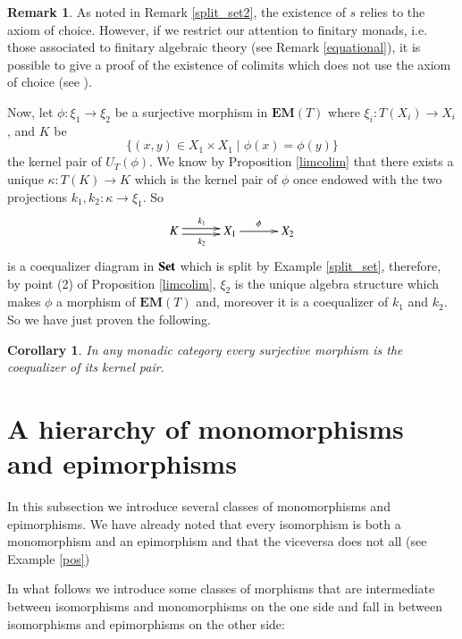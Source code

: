 \documentclass[12pt]{article}
\newtheorem{corollary}[lemma]{Corollary}
\theoremstyle{definition}
\newtheorem{remark}[lemma]{Remark}
\def\X{\mathfrak X}
\newcommand{\Set}{\textbf{\textup{Set}}}
\newcommand{\eim}[1]{\mathbf{EM}{(#1)}}
\numberwithin{equation}{section}
\begin{document}
\begin{remark} As noted in Remark \ref{split_set2}, the existence of $s$ relies to the axiom of choice. However, if we restrict our attention to finitary monads, i.e. those associated to finitary algebraic theory (see Remark \ref{equational}), it is possible to give a proof of the existence of colimits which does not use the axiom of choice (see \cite{linton1}). 
\end{remark}
Now, let $\phi:\xi_1\rightarrow \xi_2$ be a surjective morphism in $\eim{T}$ where $\xi_i:T(X_i)\rightarrow X_i$, and $K$ be
\[\{(x,y)\in X_1\times X_1\mid \phi(x)=\phi(y)\}\]
the kernel pair of $U_T(\phi)$. We know by Proposition \ref{limcolim} that there exists a unique $\kappa:T(K)\rightarrow K$ which is the kernel pair of $\phi$ once endowed with the two projections $k_1, k_2:\kappa \rightarrow \xi_1$. So
\[
\xymatrix@C=30pt{
	K\ar@<-.5ex>[r]_{k_2}\ar@<.5ex>[r]^{k_1}&X_1\ar[r]^{\phi}&X_2 
}
\]
is a coequalizer diagram in $\Set$ which is split by Example \ref{split_set}, therefore, by point (2) of Proposition \ref{limcolim}, $\xi_2$ is the unique algebra structure which makes $\phi$ a morphism of $\eim{T}$ and, moreover it is a coequalizer of $k_1$ and $k_2$. So we have just proven the following.
\begin{corollary}\label{monadic_surjective}
	In any monadic category every surjective morphism is the coequalizer of its kernel pair.
\end{corollary}


\section{A hierarchy of monomorphisms and epimorphisms}\label{MoreMono} 

In this subsection we  introduce several classes of monomorphisms and epimorphisms. We have already noted that every isomorphism is both a monomorphism and an epimorphism and that the viceversa does not all (see Example \ref{pos})
\iffalse 
Let us see this for epimorphisms (the statement for monomorphism follows dually): given an isomorphism $\phi\colon X\to Y$ in some category $\X$, let $\alpha,\,\beta\colon Y\rightrightarrows Z$ be two morphisms such that $\alpha\circ\phi=\beta\circ \phi$, then
\[
\alpha=(\alpha\circ\phi)\circ\phi^{-1}=(\beta\circ \phi)\circ\phi^{-1}=\beta.
\] 
\fi 

In what follows we introduce some classes of morphisms that are intermediate between isomorphisms and monomorphisms on the one side and fall in between isomorphisms and epimorphisms on the other side:
\end{document}
